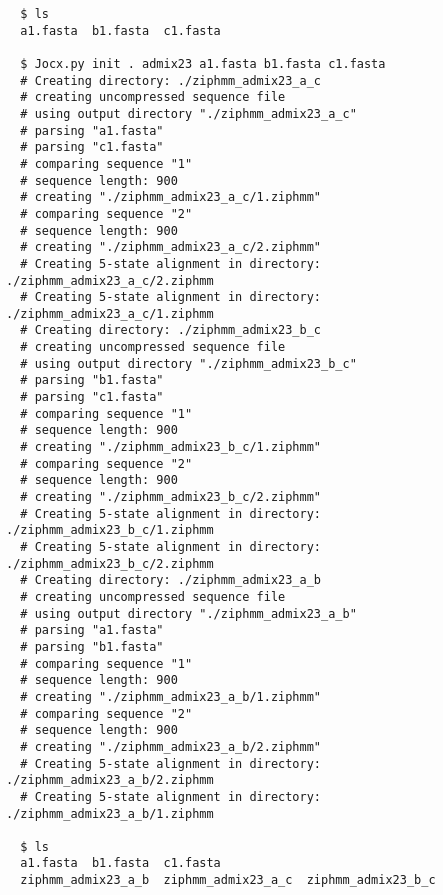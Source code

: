 {\small{}\begin{verbatim}
  $ ls
  a1.fasta  b1.fasta  c1.fasta

  $ Jocx.py init . admix23 a1.fasta b1.fasta c1.fasta
  # Creating directory: ./ziphmm_admix23_a_c
  # creating uncompressed sequence file
  # using output directory "./ziphmm_admix23_a_c"
  # parsing "a1.fasta"
  # parsing "c1.fasta"
  # comparing sequence "1"
  # sequence length: 900
  # creating "./ziphmm_admix23_a_c/1.ziphmm"
  # comparing sequence "2"
  # sequence length: 900
  # creating "./ziphmm_admix23_a_c/2.ziphmm"
  # Creating 5-state alignment in directory: ./ziphmm_admix23_a_c/2.ziphmm
  # Creating 5-state alignment in directory: ./ziphmm_admix23_a_c/1.ziphmm
  # Creating directory: ./ziphmm_admix23_b_c
  # creating uncompressed sequence file
  # using output directory "./ziphmm_admix23_b_c"
  # parsing "b1.fasta"
  # parsing "c1.fasta"
  # comparing sequence "1"
  # sequence length: 900
  # creating "./ziphmm_admix23_b_c/1.ziphmm"
  # comparing sequence "2"
  # sequence length: 900
  # creating "./ziphmm_admix23_b_c/2.ziphmm"
  # Creating 5-state alignment in directory: ./ziphmm_admix23_b_c/1.ziphmm
  # Creating 5-state alignment in directory: ./ziphmm_admix23_b_c/2.ziphmm
  # Creating directory: ./ziphmm_admix23_a_b
  # creating uncompressed sequence file
  # using output directory "./ziphmm_admix23_a_b"
  # parsing "a1.fasta"
  # parsing "b1.fasta"
  # comparing sequence "1"
  # sequence length: 900
  # creating "./ziphmm_admix23_a_b/1.ziphmm"
  # comparing sequence "2"
  # sequence length: 900
  # creating "./ziphmm_admix23_a_b/2.ziphmm"
  # Creating 5-state alignment in directory: ./ziphmm_admix23_a_b/2.ziphmm
  # Creating 5-state alignment in directory: ./ziphmm_admix23_a_b/1.ziphmm

  $ ls
  a1.fasta  b1.fasta  c1.fasta
  ziphmm_admix23_a_b  ziphmm_admix23_a_c  ziphmm_admix23_b_c


\end{verbatim}}
